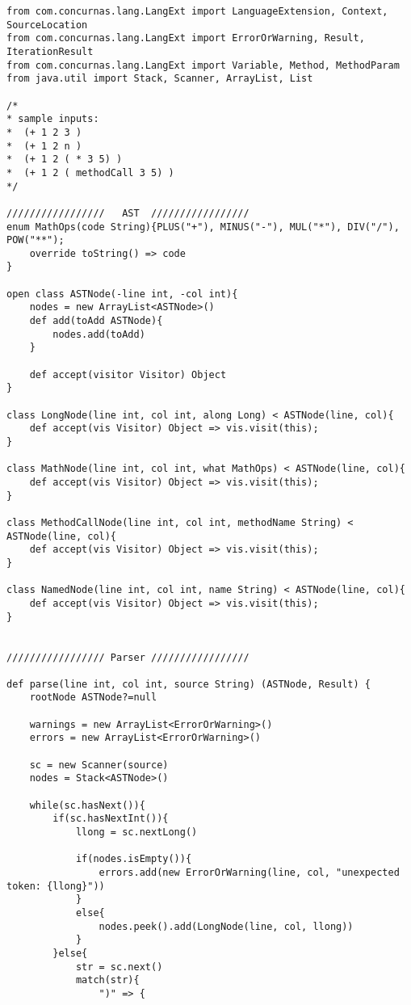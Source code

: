 \documentclass[conc-doc]{subfiles}
\begin{document}
\begin{lstlisting}
from com.concurnas.lang.LangExt import LanguageExtension, Context, SourceLocation
from com.concurnas.lang.LangExt import ErrorOrWarning, Result, IterationResult
from com.concurnas.lang.LangExt import Variable, Method, MethodParam
from java.util import Stack, Scanner, ArrayList, List

/*
* sample inputs:
*  (+ 1 2 3 )
*  (+ 1 2 n )
*  (+ 1 2 ( * 3 5) )
*  (+ 1 2 ( methodCall 3 5) )
*/

/////////////////   AST  /////////////////
enum MathOps(code String){PLUS("+"), MINUS("-"), MUL("*"), DIV("/"), POW("**");
	override toString() => code
}

open class ASTNode(-line int, -col int){
	nodes = new ArrayList<ASTNode>()
	def add(toAdd ASTNode){
		nodes.add(toAdd)
	}
	
	def accept(visitor Visitor) Object 
}

class LongNode(line int, col int, along Long) < ASTNode(line, col){
	def accept(vis Visitor) Object => vis.visit(this);
}

class MathNode(line int, col int, what MathOps) < ASTNode(line, col){
	def accept(vis Visitor) Object => vis.visit(this);
}

class MethodCallNode(line int, col int, methodName String) < ASTNode(line, col){
	def accept(vis Visitor) Object => vis.visit(this);
}

class NamedNode(line int, col int, name String) < ASTNode(line, col){
	def accept(vis Visitor) Object => vis.visit(this);
}


///////////////// Parser /////////////////

def parse(line int, col int, source String) (ASTNode, Result) {
	rootNode ASTNode?=null
	
	warnings = new ArrayList<ErrorOrWarning>()
	errors = new ArrayList<ErrorOrWarning>()
	
	sc = new Scanner(source)
	nodes = Stack<ASTNode>()
	
	while(sc.hasNext()){
		if(sc.hasNextInt()){
			llong = sc.nextLong()
			
			if(nodes.isEmpty()){
				errors.add(new ErrorOrWarning(line, col, "unexpected token: {llong}"))
			}
			else{
				nodes.peek().add(LongNode(line, col, llong))
			}
		}else{
			str = sc.next()
			match(str){
				")" => {
					

\end{lstlisting}
\end{document}
